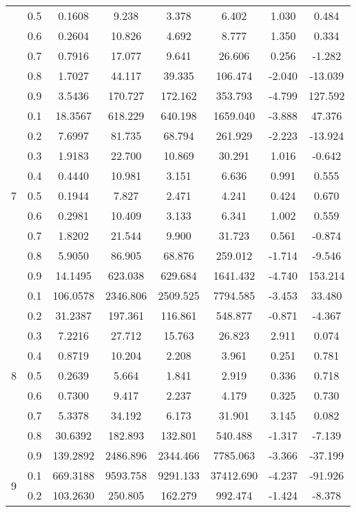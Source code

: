 \documentclass[11pt,a4paper]{report}
\begin{document}
\begin{longtable}{ | c | c || c | c | c | c | c | c | }
 & 0.5 & 0.1608 & 9.238 & 3.378 & 6.402 & 1.030 & 0.484 \\
 & 0.6 & 0.2604 & 10.826 & 4.692 & 8.777 & 1.350 & 0.334 \\
 & 0.7 & 0.7916 & 17.077 & 9.641 & 26.606 & 0.256 & -1.282 \\
 & 0.8 & 1.7027 & 44.117 & 39.335 & 106.474 & -2.040 & -13.039 \\
 & 0.9 & 3.5436 & 170.727 & 172.162 & 353.793 & -4.799 & 127.592 \\
 \hline
\multirow{9}{*}{7} & 0.1 & 18.3567 & 618.229 & 640.198 & 1659.040 & -3.888 & 47.376 \\
 & 0.2 & 7.6997 & 81.735 & 68.794 & 261.929 & -2.223 & -13.924 \\
 & 0.3 & 1.9183 & 22.700 & 10.869 & 30.291 & 1.016 & -0.642 \\
 & 0.4 & 0.4440 & 10.981 & 3.151 & 6.636 & 0.991 & 0.555 \\
 & 0.5 & 0.1944 & 7.827 & 2.471 & 4.241 & 0.424 & 0.670 \\
 & 0.6 & 0.2981 & 10.409 & 3.133 & 6.341 & 1.002 & 0.559 \\
 & 0.7 & 1.8202 & 21.544 & 9.900 & 31.723 & 0.561 & -0.874 \\
 & 0.8 & 5.9050 & 86.905 & 68.876 & 259.012 & -1.714 & -9.546 \\
 & 0.9 & 14.1495 & 623.038 & 629.684 & 1641.432 & -4.740 & 153.214 \\
 \hline
\multirow{9}{*}{8} & 0.1 & 106.0578 & 2346.806 & 2509.525 & 7794.585 & -3.453 & 33.480 \\
 & 0.2 & 31.2387 & 197.361 & 116.861 & 548.877 & -0.871 & -4.367 \\
 & 0.3 & 7.2216 & 27.712 & 15.763 & 26.823 & 2.911 & 0.074 \\
 & 0.4 & 0.8719 & 10.204 & 2.208 & 3.961 & 0.251 & 0.781 \\
 & 0.5 & 0.2639 & 5.664 & 1.841 & 2.919 & 0.336 & 0.718 \\
 & 0.6 & 0.7300 & 9.417 & 2.237 & 4.179 & 0.325 & 0.730 \\
 & 0.7 & 5.3378 & 34.192 & 6.173 & 31.901 & 3.145 & 0.082 \\
 & 0.8 & 30.6392 & 182.893 & 132.801 & 540.488 & -1.317 & -7.139 \\
 & 0.9 & 139.2892 & 2486.896 & 2344.466 & 7785.063 & -3.366 & -37.199 \\
 \hline
\multirow{9}{*}{9} & 0.1 & 669.3188 & 9593.758 & 9291.133 & 37412.690 & -4.237 & -91.926 \\
 & 0.2 & 103.2630 & 250.805 & 162.279 & 992.474 & -1.424 & -8.378 \\

\end{longtable}
\end{document}
